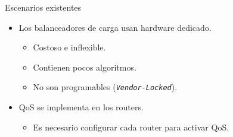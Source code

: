 \documentclass[10pt,spanish,xcolor={svgnames}]{beamer}
\begin{document}
\begin{frame}{Escenarios existentes}
\vspace*{-2em}
\begin{alertblock}{\LARGE}
\large
\begin{itemize}
	\item Los balanceadores de carga usan hardware dedicado.
	\begin{itemize}
    	\item Costoso e inflexible.
		\item Contienen pocos algoritmos.
        \item No son programables (\texttt{\textit{Vendor-Locked}}).
	\end{itemize}
    \vspace{1em}
  	\item QoS se implementa en los routers.
    \begin{itemize}
    \item  Es necesario configurar cada router para activar QoS.
    \end{itemize}
\end{itemize}
\end{alertblock}
\end{frame}
\end{document}

